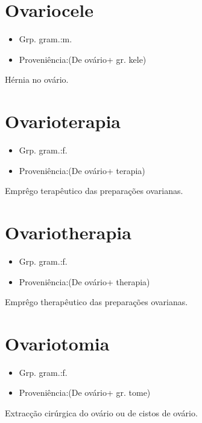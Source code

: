 \section{Ovariocele}
\begin{itemize}
\item {Grp. gram.:m.}
\end{itemize}
\begin{itemize}
\item {Proveniência:(De \textunderscore ovário\textunderscore  + gr. \textunderscore kele\textunderscore )}
\end{itemize}
Hérnia no ovário.
\section{Ovarioterapia}
\begin{itemize}
\item {Grp. gram.:f.}
\end{itemize}
\begin{itemize}
\item {Proveniência:(De \textunderscore ovário\textunderscore  + \textunderscore terapia\textunderscore )}
\end{itemize}
Emprêgo terapêutico das preparações ovarianas.
\section{Ovariotherapia}
\begin{itemize}
\item {Grp. gram.:f.}
\end{itemize}
\begin{itemize}
\item {Proveniência:(De \textunderscore ovário\textunderscore  + \textunderscore therapia\textunderscore )}
\end{itemize}
Emprêgo therapêutico das preparações ovarianas.
\section{Ovariotomia}
\begin{itemize}
\item {Grp. gram.:f.}
\end{itemize}
\begin{itemize}
\item {Proveniência:(De \textunderscore ovário\textunderscore  + gr. \textunderscore tome\textunderscore )}
\end{itemize}
Extracção cirúrgica do ovário ou de cistos de ovário.
